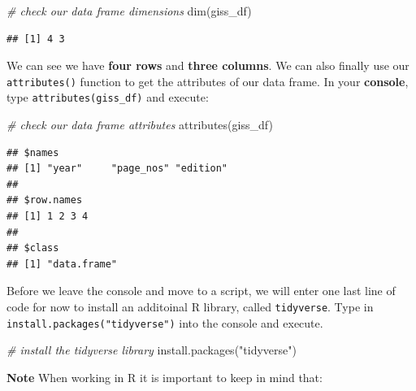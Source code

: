 \documentclass[
]{book}
\newenvironment{Shaded}{\begin{snugshade}}{\end{snugshade}}
\newcommand{\CommentTok}[1]{\textcolor[rgb]{0.56,0.35,0.01}{\textit{#1}}}
\newcommand{\FunctionTok}[1]{\textcolor[rgb]{0.00,0.00,0.00}{#1}}
\newcommand{\NormalTok}[1]{#1}
\newcommand{\StringTok}[1]{\textcolor[rgb]{0.31,0.60,0.02}{#1}}
\begin{document}
\begin{Shaded}
\begin{Highlighting}[]
\CommentTok{\# check our data frame dimensions}
\FunctionTok{dim}\NormalTok{(giss\_df)}
\end{Highlighting}
\end{Shaded}

\begin{verbatim}
## [1] 4 3
\end{verbatim}

We can see we have \textbf{four rows} and \textbf{three columns}. We can also finally use our \texttt{attributes()} function to get the attributes of our data frame. In your \textbf{console}, type \texttt{attributes(giss\_df)} and execute:

\begin{Shaded}
\begin{Highlighting}[]
\CommentTok{\# check our data frame attributes}
\FunctionTok{attributes}\NormalTok{(giss\_df)}
\end{Highlighting}
\end{Shaded}

\begin{verbatim}
## $names
## [1] "year"     "page_nos" "edition" 
## 
## $row.names
## [1] 1 2 3 4
## 
## $class
## [1] "data.frame"
\end{verbatim}

Before we leave the console and move to a script, we will enter one last line of code for now to install an additoinal R library, called \texttt{tidyverse}. Type in \texttt{install.packages("tidyverse")} into the console and execute.

\begin{Shaded}
\begin{Highlighting}[]
\CommentTok{\# install the tidyverse library}
\FunctionTok{install.packages}\NormalTok{(}\StringTok{"tidyverse"}\NormalTok{)}
\end{Highlighting}
\end{Shaded}

\textbf{Note}
When working in R it is important to keep in mind that:
\end{document}
